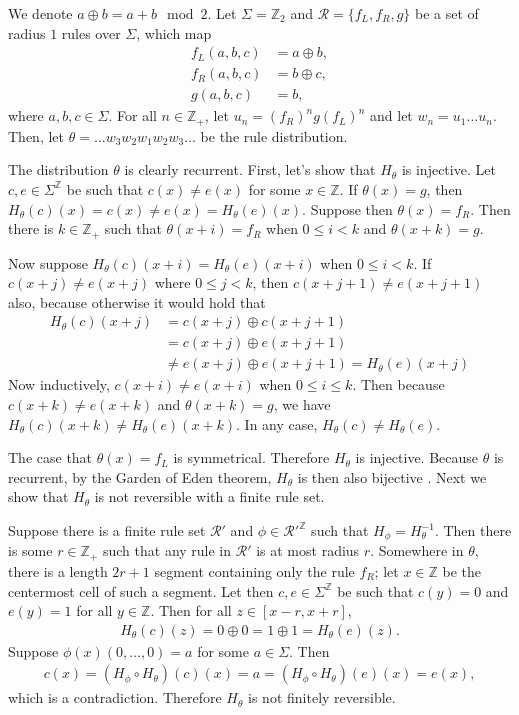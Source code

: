 \documentclass[runningheads]{llncs}
\newcommand{\Z}{\mathbb{Z}}
\newcommand{\R}{\mathcal{R}}
\begin{document}
\begin{example}
We denote $a \oplus b = a + b \mod 2$. Let $\Sigma = \Z_2$ and $\R = \{f_L, f_R, g \}$ be a set of radius $1$ rules over $\Sigma$, which map
\begin{align*}
f_L(a,b,c) &= a \oplus b, \\
f_R(a,b,c) &= b \oplus c, \\
g(a,b,c) &= b,
\end{align*}
where $a,b,c \in \Sigma$. For all $n \in \Z_+$, let $u_n = (f_R)^n g (f_L)^n$ and let $w_n =  u_1 \ldots u_n$. Then, let $\theta = \ldots w_3 w_2 w_1 w_2 w_3 \ldots$ be the rule distribution.

The distribution $\theta$ is clearly recurrent. First, let's show that $H_\theta$ is injective. Let $c,e \in \Sigma^\Z$ be such that $c(x) \neq e(x)$ for some $x \in \Z$. If $\theta (x) = g$, then $H_\theta (c)(x) = c(x)\neq e(x)= H_\theta (e)(x)$. Suppose then $\theta (x) = f_R$. Then there is $k\in \Z_+$ such that  $\theta(x+i) = f_R$ when $0 \leq i < k$ and $\theta(x+k) = g$. 

Now suppose $H_\theta (c)(x+i) = H_\theta (e)(x+i)$ when $0 \leq i < k$. If $c(x+j) \neq e(x+j)$ where $0 \leq j < k$, then $c(x+j+1) \neq e(x+j+1)$ also, because otherwise it would hold that
\begin{align*}
H_\theta (c)(x+j) &= c(x+j) \oplus c(x+j+1) \\
&= c(x+j) \oplus e(x+j+1)\\
&\neq e(x+j) \oplus e(x+j+1) = H_\theta(e)(x+j)
\end{align*}
Now inductively, $c(x+i) \neq e(x+i)$ when  $0 \leq i \leq k$. Then because $c(x+k) \neq e(x+k)$ and $\theta(x+k)=g$, we have $H_\theta(c)(x+k) \neq H_\theta(e)(x+k)$. In any case, $H_\theta (c) \neq H_\theta (e)$.

The case that $\theta(x) = f_L$ is symmetrical. Therefore $H_\theta$ is injective. Because $\theta$ is recurrent, by the Garden of Eden theorem, $H_\theta$ is then also bijective \cite{goe}. Next we show that $H_\theta$ is not reversible with a finite rule set. 

Suppose there is a finite rule set $\R'$ and $\phi \in \R'^\Z$ such that $H_\phi = H_\theta^{-1}$. Then there is some $r\in \Z_+$ such that any rule in $\mathcal{R}'$ is at most radius $r$. Somewhere in $\theta$, there is a length  $2r+1$ segment containing only the rule $f_R$; let $x \in \Z$ be the centermost cell of such a segment. Let then $c,e \in \Sigma^\Z$ be such that $c(y) = 0$ and $e(y) = 1$ for all $y\in \Z$. Then for all $z \in [x-r,x+r]$,
\begin{align*}
H_\theta(c)(z) = 0 \oplus 0 = 1 \oplus 1 = H_\theta(e)(z).
\end{align*}
Suppose $\phi(x)(0,\ldots,0) = a$ for some $a \in \Sigma$. Then 
\begin{align*}
c(x) = (H_\phi \circ H_\theta) (c) (x) = a = (H_\phi \circ H_\theta) (e) (x) = e(x),
\end{align*}
which is a contradiction. Therefore $H_\theta$ is not finitely reversible.
\end{example}
\end{document}
